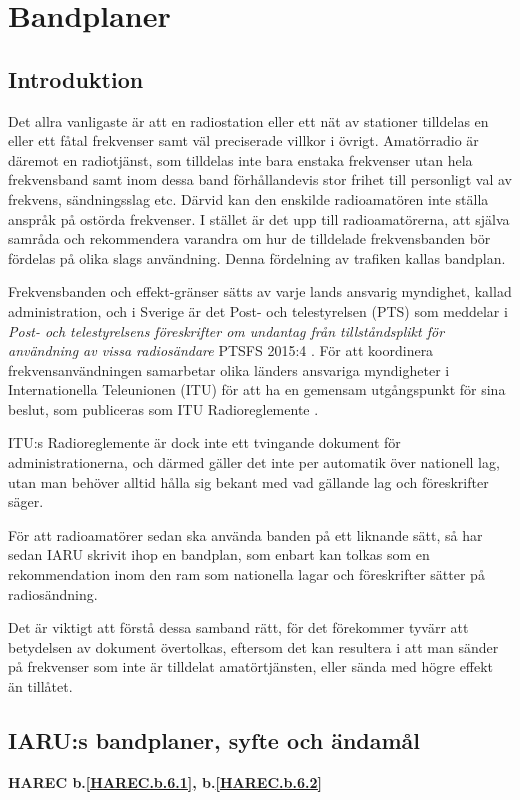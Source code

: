 \section{Bandplaner}
\label{bandplaner}

\subsection{Introduktion}

Det allra vanligaste är att en radiostation eller ett nät av stationer tilldelas
en eller ett fåtal frekvenser samt väl preciserade villkor i övrigt. Amatörradio
är däremot en radiotjänst, som tilldelas inte bara enstaka frekvenser utan hela
frekvensband samt inom dessa band förhållandevis stor frihet till personligt val
av frekvens, sändningsslag etc. Därvid kan den enskilde radioamatören inte
ställa anspråk på ostörda frekvenser. I stället är det upp till radioamatörerna,
att själva samråda och rekommendera varandra om hur de tilldelade frekvensbanden
bör fördelas på olika slags användning. Denna fördelning av trafiken kallas
bandplan.

Frekvensbanden och effekt-gränser sätts av varje lands ansvarig myndighet,
kallad administration, och i Sverige är det Post- och telestyrelsen (PTS) som
meddelar i \emph{Post- och telestyrelsens föreskrifter om undantag från
tillståndsplikt för användning av vissa radiosändare} PTSFS 2015:4
\cite{PTSFS2015:4}. För att koordinera frekvensanvändningen samarbetar olika
länders ansvariga myndigheter i Internationella Teleunionen (ITU) för att
ha en gemensam utgångspunkt för sina beslut, som publiceras som ITU
Radioreglemente \cite{ITU-RR}.

ITU:s Radioreglemente är dock inte ett tvingande dokument för
administrationerna, och därmed gäller det inte per automatik över
nationell lag, utan man behöver alltid hålla sig bekant med vad gällande lag
och föreskrifter säger.

För att radioamatörer sedan ska använda banden på ett liknande sätt, så har
sedan IARU skrivit ihop en bandplan, som enbart kan tolkas som en
rekommendation inom den ram som nationella lagar och föreskrifter sätter på
radiosändning.

Det är viktigt att förstå dessa samband rätt, för det förekommer tyvärr att
betydelsen av dokument övertolkas, eftersom det kan resultera i att man sänder
på frekvenser som inte är tilldelat amatörtjänsten, eller sända med högre
effekt än tillåtet.

\subsection{IARU:s bandplaner, syfte och ändamål}
\textbf{
HAREC b.\ref{HAREC.b.6.1}\label{myHAREC.b.6.1},
 b.\ref{HAREC.b.6.2}\label{myHAREC.b.6.2}
}

